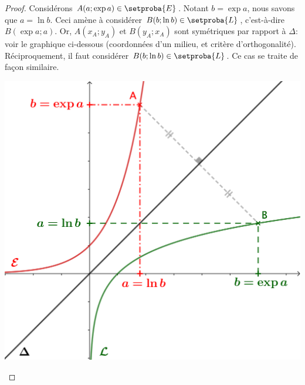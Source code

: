 \begin{proof}
	Considérons $A(a;\exp a) \in \setproba{E}$.
	Notant $b = \exp a$, nous savons que $a = \ln b$.
	Ceci amène à considérer $B(b;\ln b) \in \setproba{L}$,
	c'est-à-dire $B(\exp a;a)$.
	Or,
	$A(x_A;y_A)$ et $B(y_A;x_A)$ sont symétriques par rapport à $\Delta$:
	voir le graphique ci-dessous
	(coordonnées d'un milieu, et critère d'orthogonalité).
	Réciproquement, il faut considérer $B(b;\ln b) \in \setproba{L}$.
	Ce cas se traite de façon similaire.

	\begin{center}
		\includegraphics[scale=.85]{content/exp/graph.png}
	\end{center}
	
	\null
	\vspace{-6.5ex}
\end{proof}
